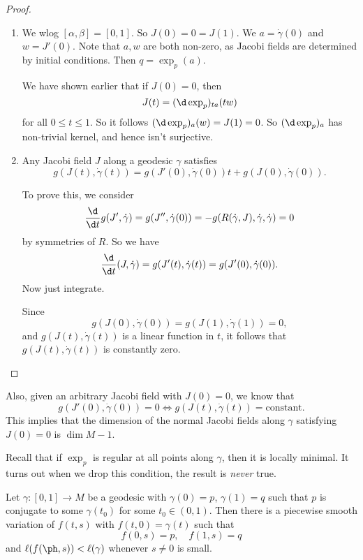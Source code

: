 \documentclass[a4paper]{article}
\begin{document}
\begin{proof}\leavevmode
  \begin{enumerate}
    \item We wlog $[\alpha, \beta] = [0, 1]$. So $J(0) = 0 = J(1)$. We $a = \dot{\gamma}(0)$ and $w = J'(0)$. Note that $a, w$ are both non-zero, as Jacobi fields are determined by initial conditions. Then $q = \exp_p(a)$.

      We have shown earlier that if $J(0) = 0$, then
      \[
        J(t) = (\d \exp_p)_{ta} (tw)
      \]
      for all $0 \leq t \leq 1$. So it follows $(\d \exp_p)_{a}(w) = J(1) = 0$. So $(\d \exp_p)_a$ has non-trivial kernel, and hence isn't surjective.
    \item
      \begin{claim}
        Any Jacobi field $J$ along a geodesic $\gamma$ satisfies
        \[
          g(J(t), \dot{\gamma}(t)) = g(J'(0), \dot{\gamma}(0)) t + g(J(0), \dot{\gamma}(0)).
        \]
      \end{claim}
      To prove this, we consider
      \[
        \frac{\d}{\d t} g(J', \dot{\gamma}) = g(J'', \dot{\gamma}(0)) = -g(R(\dot{\gamma}, J), \dot{\gamma}, \dot{\gamma}) = 0
      \]
      by symmetries of $R$. So we have
      \[
        \frac{\d}{\d t}(J, \dot{\gamma}) = g(J'(t), \dot{\gamma}(t)) = g(J'(0), \dot{\gamma}(0)).
      \]
      Now just integrate.

      Since
      \[
        g(J(0), \dot{\gamma}(0)) = g(J(1), \dot{\gamma}(1)) = 0,
      \]
      and $g(J(t), \dot{\gamma}(t))$ is a linear function in $t$, it follows that $g(J(t), \dot{\gamma}(t))$ is constantly zero.
  \end{enumerate}
\end{proof}
Also, given an arbitrary Jacobi field with $J(0) = 0$, we know that
\[
  g(J'(0), \dot{\gamma}(0)) = 0 \Longleftrightarrow g(J(t), \dot{\gamma}(t)) = \text{constant}.
\]
This implies that the dimension of the normal Jacobi fields along $\gamma$ satisfying $J(0) = 0$ is $\dim M - 1$.

Recall that if $\exp_p$ is regular at all points along $\gamma$, then it is locally minimal. It turns out when we drop this condition, the result is \emph{never} true.

\begin{thm}
  Let $\gamma: [0, 1] \to M$ be a geodesic with $\gamma(0) = p$, $\gamma(1) = q$ such that $p$ is conjugate to some $\gamma(t_0)$ for some $t_0 \in (0, 1)$. Then there is a piecewise smooth variation of $f(t, s)$ with $f(t, 0) = \gamma(t)$ such that
  \[
    f(0, s) = p,\quad f(1, s) = q
  \]
  and $\ell(f(\ph, s)) < \ell(\gamma)$ whenever $s \not= 0$ is small.
\end{thm}
\end{document}
